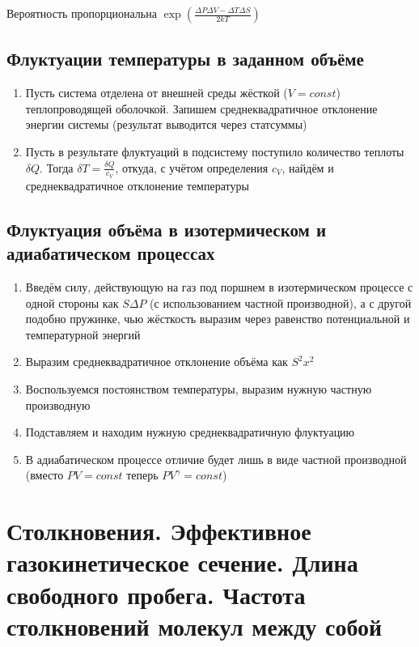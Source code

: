 \documentclass[a4paper, 14pt]{article}
\begin{document}
    Вероятность пропорциональна $\exp \left(\frac{\Delta P \Delta V - \Delta T \Delta S}{2kT}\right)$
    
    \subsection{Флуктуации температуры в заданном объёме}
    
    \begin{enumerate}
        \item Пусть система отделена от внешней среды жёсткой ($V = const$) теплопроводящей оболочкой.
        Запишем среднеквадратичное отклонение энергии системы (результат выводится через статсуммы)
        \item Пусть в результате флуктуаций в подсистему поступило количество теплоты $\delta Q$.
        Тогда $\delta T = \frac{\delta Q}{c_V}$, откуда, с учётом определения $c_V$, найдём и среднеквадратичное
        отклонение температуры
    \end{enumerate}
    
    \subsection{Флуктуация объёма в изотермическом и адиабатическом процессах}
    
    \begin{enumerate}
        \item Введём силу, действующую на газ под поршнем в изотермическом процессе с одной стороны как $S \Delta P$
        (с использованием частной производной), а с другой подобно пружинке, чью жёсткость выразим через равенство
        потенциальной и температурной энергий
        \item Выразим среднеквадратичное отклонение объёма как $S^2 x^2$
        \item Воспользуемся постоянством температуры, выразим нужную частную производную
        \item Подставляем и находим нужную среднеквадратичную флуктуацию
        \item В адиабатическом процессе отличие будет лишь в виде частной производной (вместо $PV = const$ теперь $PV^\gamma = const$)
    \end{enumerate}
    
    \section{Столкновения. Эффективное газокинетическое сечение.
    Длина свободного пробега.
    Частота столкновений молекул между собой}
    
\end{document}
